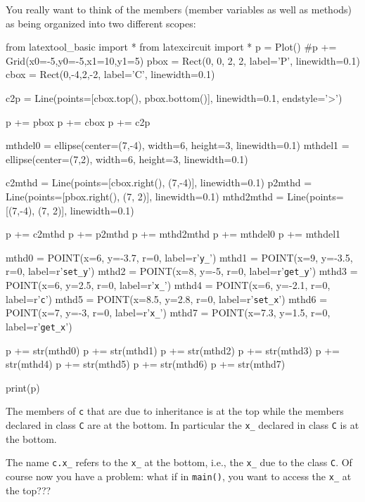You really want to think of the members (member variables as well as
methods) as being organized into two different scopes:
\begin{python}
from latextool_basic import *
from latexcircuit import *
p = Plot()
#p += Grid(x0=-5,y0=-5,x1=10,y1=5)
pbox = Rect(0, 0, 2, 2, label='P', linewidth=0.1)
cbox = Rect(0,-4,2,-2, label='C', linewidth=0.1)

c2p = Line(points=[cbox.top(), pbox.bottom()], linewidth=0.1, endstyle='>')

p += pbox
p += cbox
p += c2p

mthdel0 = ellipse(center=(7,-4), width=6, height=3, linewidth=0.1)
mthdel1 = ellipse(center=(7,2), width=6, height=3, linewidth=0.1)

c2mthd = Line(points=[cbox.right(), (7,-4)], linewidth=0.1)
p2mthd = Line(points=[pbox.right(), (7, 2)], linewidth=0.1)
mthd2mthd = Line(points=[(7,-4), (7, 2)], linewidth=0.1)

p += c2mthd
p += p2mthd
p += mthd2mthd
p += mthdel0
p += mthdel1

mthd0 = POINT(x=6, y=-3.7, r=0, label=r'\verb!y_!')
mthd1 = POINT(x=9, y=-3.5, r=0, label=r'\verb!set_y!')
mthd2 = POINT(x=8, y=-5, r=0, label=r'\verb!get_y!')
mthd3 = POINT(x=6, y=2.5, r=0, label=r'\verb!x_!')
mthd4 = POINT(x=6, y=-2.1, r=0, label=r'\large\verb!c!')
mthd5 = POINT(x=8.5, y=2.8, r=0, label=r'\verb!set_x!')
mthd6 = POINT(x=7, y=-3, r=0, label=r'\verb!x_!')
mthd7 = POINT(x=7.3, y=1.5, r=0, label=r'\verb!get_x!')

p += str(mthd0)
p += str(mthd1)
p += str(mthd2)
p += str(mthd3)
p += str(mthd4)
p += str(mthd5)
p += str(mthd6)
p += str(mthd7)

print(p)
\end{python}
The members of \verb!c! that are due to inheritance is at the top while
the members declared in class \verb!C! are at the bottom. In particular
the \verb!x_! declared in class \verb!C! is at the bottom.

The name \verb!c.x_! refers to the \verb!x_! at the bottom, i.e., the
\verb!x_! due to the class \verb!C!. Of course now you have a problem:
what if in \verb!main()!, you want to access the \verb!x_! at the
top???

